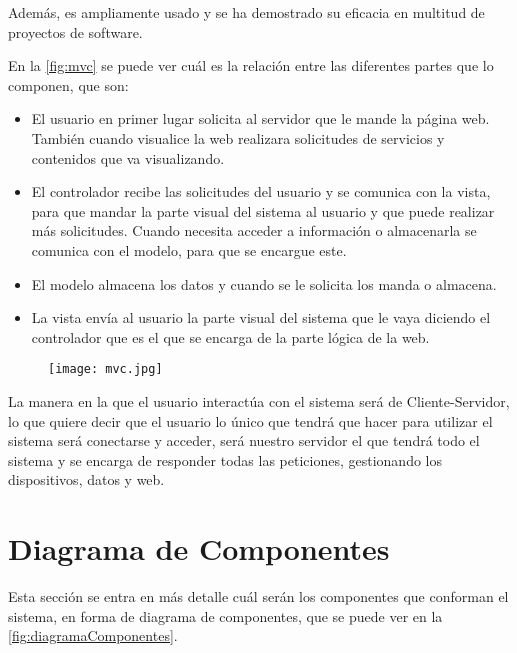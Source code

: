 Además, es ampliamente usado y se ha demostrado su eficacia en multitud de proyectos de software.
\pagebreak

En la \autoref{fig:mvc} se puede ver cuál es la relación entre las diferentes partes que lo componen, que son:
\begin{itemize}
	\item El usuario en primer lugar solicita al servidor que le mande la página web. También cuando visualice la web realizara solicitudes de servicios y contenidos que va visualizando.
	\item El controlador recibe las solicitudes del usuario y se comunica con la vista, para que mandar la parte visual del sistema al usuario y que puede realizar más solicitudes. Cuando necesita acceder a información o almacenarla se comunica con el modelo, para que se encargue este.
	\item El modelo almacena los datos y cuando se le solicita los manda o almacena.
	\item La vista envía al usuario la parte visual del sistema que le vaya diciendo el controlador que es el que se encarga de la parte lógica de la web.
\end{itemize}

\begin{figure}[H]
	{\texttt{[image: mvc.jpg]}}
\end{figure}

La manera en la que el usuario interactúa con el sistema será de Cliente-Servidor, lo que quiere decir que el usuario lo único que tendrá que hacer para utilizar el sistema será conectarse y acceder, será nuestro servidor el que tendrá todo el sistema y se encarga de responder todas las peticiones, gestionando los dispositivos, datos y web. 
\pagebreak

\section{Diagrama de Componentes}\label{sec:diagramaComponentes}
Esta sección se entra en más detalle cuál serán los componentes que conforman el sistema, en forma de diagrama de componentes, que se puede ver en la \autoref{fig:diagramaComponentes}.

